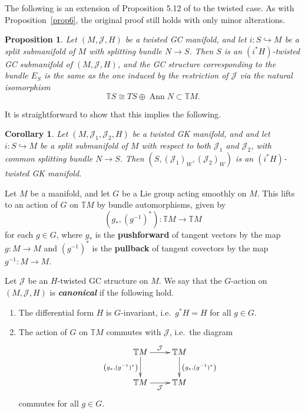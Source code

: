 \documentclass[pdftex]{sigma}
\newtheorem{Proposition}[Theorem]{Proposition}
\newtheorem{Corollary}[Theorem]{Corollary}
{\theoremstyle{definition}
\newtheorem{Remark}[Theorem]{Remark}
\newtheorem{Definition}[Theorem]{Definition}
\newtheorem{Example}[Theorem]{Example}
}
\numberwithin{equation}{section}
\newcommand{\deff}[1]{\textbf{\emph{#1}}}
\newcommand{\func}[3]{#1 \colon #2 \to #3}
\newcommand{\hookfunc}[3]{#1 \colon #2 \hookrightarrow #3}
\newcommand{\pont}[1]{\mathbb{T} {#1}}
\newcommand{\tang}{T}
\begin{document}
The following is an extension of Proposition 5.12 of \cite{benbassat} to the twisted case.  As with Proposition~\ref{prop6}, the original proof still holds with only minor alterations.


\begin{Proposition}
Let $(M,\mathcal{J},H)$ be a twisted GC manifold, and
let $\hookfunc{i}{S}{M}$ be a split submanifold of $M$ with splitting bundle $N \to S$.  Then $S$ is an $(i^* H)$-twisted GC submanifold of $(M,\mathcal{J},H)$, and the GC structure corresponding to the bundle $E_S$ is the same as the one induced by the restriction of $\mathcal{J}$ via the natural isomorphism
\[
  \pont{S} \cong \tang S \oplus \operatorname{Ann} N \subset \pont{M}.
\]
\end{Proposition}

It is straightforward to show that this implies the following.

\begin{Corollary}
Let $(M, \mathcal{J}_1, \mathcal{J}_2,H)$ be a twisted GK manifold, and and
let $\hookfunc{i}{S}{M}$ be a split submanifold of $M$ with respect to both $\mathcal{J}_1$ and $\mathcal{J}_2$, with common splitting bundle $N \to S$.  Then $\left( S, (\mathcal{J}_1)_W, (\mathcal{J}_2)_W \right)$ is an $(i^*H)$-twisted GK manifold.
\end{Corollary}


\begin{Definition}
Let $M$ be a manifold, and let $G$ be a Lie group acting smoothly on $M$.  This lifts to an action of $G$ on $\pont{M}$ by bundle automorphisms, given by
\[
  \func{\left( g_*, (g^{-1})^* \right)}{\pont{M}}{\pont{M}}
\]
for each $g \in G$, where $g_{\ast}$ is the {\bf pushforward} of tangent vectors by the map $\func{g}{M}{M}$ and $(g^{-1})^{\ast}$ is the {\bf pullback} of tangent covectors by the map $\func{g^{-1}}{M}{M}$.

Let $\mathcal{J}$ be an $H$-twisted GC structure on $M$.  We say that the $G$-action on $(M, \mathcal{J}, H)$ is \deff{canonical} if the following hold.
\begin{enumerate}\itemsep=0pt
  \item The dif\/ferential form $H$ is $G$-invariant, i.e.\ $g^* H = H$ for all $g \in G$.
  \item The action of $G$ on $\pont{M}$ commutes with $\mathcal{J}$, i.e.\ the diagram
\[
  \xymatrix{
  \pont{M} \ar[d]_{ \left( g_*, (g^{-1})^* \right) } \ar[r]^{\mathcal{J}}
  &
  \pont{M} \ar[d]^{ \left( g_*, (g^{-1})^* \right) } \\
  \pont{M} \ar[r]_{\mathcal{J}}
  &
  \pont{M}
  }
\]
commutes for all $g \in G$.
\end{enumerate}
\end{Definition}
\end{document}
